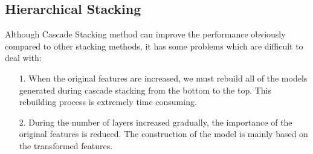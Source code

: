 \documentclass[12pt]{article}
\begin{document}
\subsection{Hierarchical Stacking}

Although Cascade Stacking method can improve the performance obviously compared to other stacking methods, it has some problems which are difficult to deal with:

\begin{itemize}
\item[1.] When the original features are increased, we must rebuild all of the models generated during cascade stacking from the bottom to the top. This rebuilding process is extremely time consuming.
\item[2.] During the number of layers increased gradually, the importance of the original features is reduced. The construction of the model is mainly based on the transformed features. 
\end{itemize}
\end{document}
